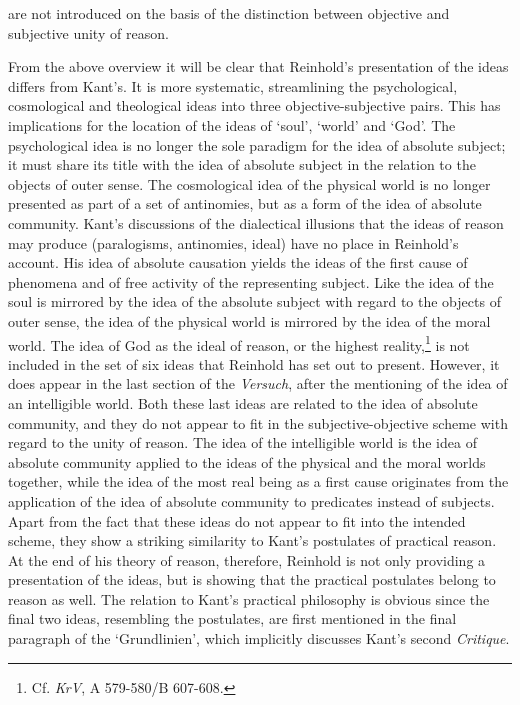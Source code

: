 are not introduced on the basis of the distinction between objective and subjective unity of reason. 

 From the above overview it will be clear that Reinhold's presentation of the ideas differs from Kant's. It is more systematic, streamlining the psychological, cosmological and theological ideas into three objective{-}subjective pairs. This has implications for the location of the ideas of `soul', `world' and `God'. The psychological idea is no longer the sole paradigm for the idea of absolute subject; it must share its title with the idea of absolute subject in the relation to the objects of outer sense. The cosmological idea of the physical world is no longer presented as part of a set of antinomies, but as a form of the idea of absolute community. Kant's discussions of the dialectical illusions that the ideas of reason may produce (paralogisms, antinomies, ideal) have no place in Reinhold's account. His idea of absolute causation yields the ideas of the first cause of phenomena and of free activity of the representing subject. Like the idea of the soul is mirrored by the idea of the absolute subject with regard to the objects of outer sense, the idea of the physical world is mirrored by the idea of the moral world. The idea of God as the ideal of reason, or the highest reality,\footnote{ Cf. \textit{KrV}, A 579{-}580/B 607{-}608. } is not included in the set of six ideas that Reinhold has set out to present. However, it does appear in the last section of the \textit{Versuch}, after the mentioning of the idea of an intelligible world. Both these last ideas are related to the idea of absolute community, and they do not appear to fit in the subjective{-}objective scheme with regard to the unity of reason. The idea of the intelligible world is the idea of absolute community applied to the ideas of the physical and the moral worlds together, while the idea of the most real being as a first cause originates from the application of the idea of absolute community to predicates instead of subjects. Apart from the fact that these ideas do not appear to fit into the intended scheme, they show a striking similarity to Kant's postulates of practical reason. At the end of his theory of reason, therefore, Reinhold is not only providing a presentation of the ideas, but is showing that the practical postulates belong to reason as well. The relation to Kant's practical philosophy is obvious since the final two ideas, resembling the postulates, are first mentioned in the final paragraph of the `Grundlinien', which implicitly discusses Kant's second \textit{Critique}. 


